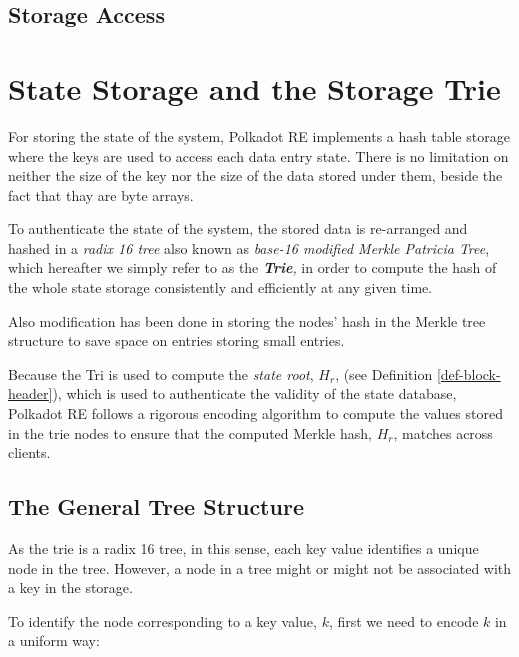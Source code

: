 \documentclass{article}
\newcommand{\tmem}[1]{{\em #1\/}}
\newcommand{\tmstrong}[1]{\textbf{#1}}
\begin{document}
\subsection{Storage Access}

\section{State Storage and the Storage Trie}

For storing the state of the system, Polkadot RE implements a hash table
storage where the keys are used to access each data entry state. There is no
limitation on neither the size of the key nor the size of the data stored
under them, beside the fact that thay are byte arrays.

To authenticate the state of the system, the stored data is re-arranged and
hashed in a {\tmem{radix 16 tree}} also known as {\tmem{base-16 modified
Merkle Patricia Tree}}, which hereafter we simply refer to as the
{\tmem{{\tmstrong{Trie}},}} in order to compute the hash of the whole state
storage consistently and efficiently at any given time.

Also modification has been done in storing the nodes' hash in the Merkle tree
structure to save space on entries storing small entries.

Because the Tri is used to compute the {\tmem{state root}}, $H_r$, (see
Definition \ref{def-block-header}), which is used to authenticate the validity
of the state database, Polkadot RE follows a rigorous encoding algorithm to
compute the values stored in the trie nodes to ensure that the computed Merkle
hash, $H_r$, matches across clients.

\subsection{The General Tree Structure}

As the trie is a radix 16 tree, in this sense, each key value identifies a
unique node in the tree. However, a node in a tree might or might not be
associated with a key in the storage.

To identify the node corresponding to a key value, $k$, first we need to
encode $k$ in a uniform way:
\end{document}
